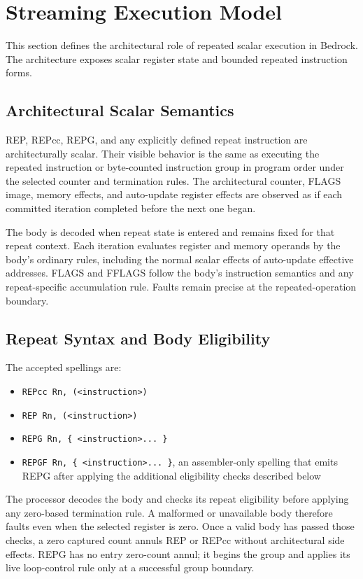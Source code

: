 \clearpage
\section{Streaming Execution Model}\label{page:streaming-execution-model}

This section defines the architectural role of repeated scalar execution in Bedrock. The architecture exposes
scalar register state and bounded repeated instruction forms.

\subsection{Architectural Scalar Semantics}
REP, REPcc, REPG, and any explicitly defined repeat instruction are architecturally scalar. Their visible behavior is
the same as executing the repeated instruction or byte-counted instruction group in program order under the selected
counter and termination rules.
The architectural counter, FLAGS image, memory effects, and auto-update register effects are observed as if each
committed iteration completed before the next one began.

The body is decoded when repeat state is entered and remains fixed for that repeat context. Each iteration evaluates
register and memory operands by the body's ordinary rules, including the normal scalar effects of auto-update
effective addresses. FLAGS and FFLAGS follow the body's instruction semantics and any repeat-specific accumulation
rule. Faults remain precise at the repeated-operation boundary.

\subsection{Repeat Syntax and Body Eligibility}

The accepted spellings are:
\begin{itemize}
\item \texttt{REPcc Rn, (<instruction>)}
\item \texttt{REP Rn, (<instruction>)}
\item \texttt{REPG Rn, \{ <instruction>... \}}
\item \texttt{REPGF Rn, \{ <instruction>... \}}, an assembler-only spelling that emits REPG after applying the
additional eligibility checks described below
\end{itemize}

The processor decodes the body and checks its repeat eligibility before applying any zero-based termination rule. A
malformed or unavailable body therefore faults even when the selected register is zero. Once a valid body has
passed those checks, a zero captured count annuls REP or REPcc without architectural side effects. REPG has no entry
zero-count annul; it begins the group and applies its live loop-control rule only at a successful group boundary.

